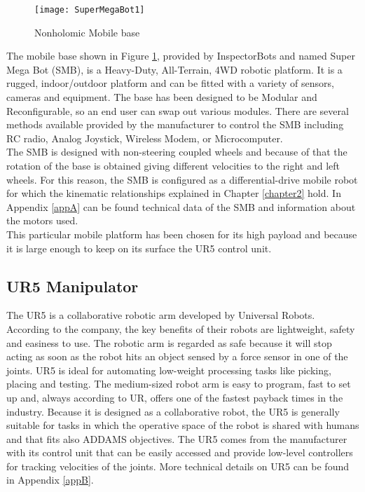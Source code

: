 \begin{figure}[h]
	\begin{center} 
		\texttt{[image: SuperMegaBot1]}
		\centering
		\caption{Nonholomic Mobile base}
		\label{fig:SuperMegaBot1}
	\end{center}
\end{figure}
The mobile base shown in Figure \ref{fig:SuperMegaBot1}, provided by InspectorBots and named Super Mega Bot (SMB), is a Heavy-Duty, All-Terrain, 4WD robotic platform. It is a rugged, indoor/outdoor platform and can be fitted with a variety of sensors, cameras and equipment. The base has been designed to be Modular and Reconfigurable, so an end user can swap out various modules. There are several methods available provided by the manufacturer to control the SMB including RC radio, Analog Joystick, Wireless Modem, or Microcomputer.\\
The SMB is designed with non-steering coupled wheels and because of that the rotation of the base is obtained giving different velocities to the right and left wheels. For this reason, the SMB is configured as a differential-drive mobile robot for which the kinematic relationships explained in Chapter \ref{chapter2} hold. In Appendix \ref{appA} can be found technical data of the SMB and information about the motors used.\\
This particular mobile platform has been chosen for its high payload and because it is large enough to keep on its surface the UR5 control unit.

\subsection{UR5 Manipulator}
The UR5 is a collaborative robotic arm developed by Universal Robots. According to the company, the key benefits of their robots are lightweight, safety and easiness to use. The robotic arm is regarded as safe because it will stop acting as soon as the robot hits an object sensed by a force sensor in one of the joints. UR5 is ideal for automating low-weight processing tasks like picking, placing and testing. The medium-sized robot arm is easy to program, fast to set up and, always according to UR, offers one of the fastest payback times in the industry. Because it is designed as a collaborative robot, the UR5 is generally suitable for tasks in which the operative space of the robot is shared with humans and that fits also ADDAMS objectives. The UR5 comes from the manufacturer with its control unit that can be easily accessed and provide low-level controllers for tracking velocities of the joints. More technical details on UR5 can be found in Appendix \ref{appB}.

